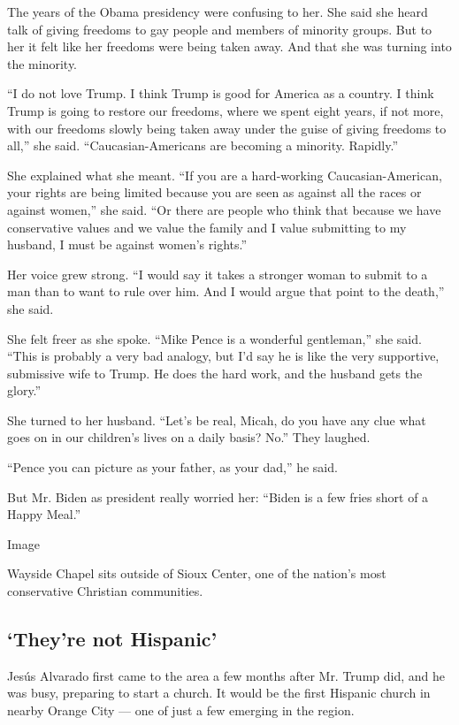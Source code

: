 The years of the Obama presidency were confusing to her. She said she
heard talk of giving freedoms to gay people and members of minority
groups. But to her it felt like her freedoms were being taken away. And
that she was turning into the minority.

``I do not love Trump. I think Trump is good for America as a country. I
think Trump is going to restore our freedoms, where we spent eight
years, if not more, with our freedoms slowly being taken away under the
guise of giving freedoms to all,'' she said. ``Caucasian-Americans are
becoming a minority. Rapidly.''

She explained what she meant. ``If you are a hard-working
Caucasian-American, your rights are being limited because you are seen
as against all the races or against women,'' she said. ``Or there are
people who think that because we have conservative values and we value
the family and I value submitting to my husband, I must be against
women's rights.''

Her voice grew strong. ``I would say it takes a stronger woman to submit
to a man than to want to rule over him. And I would argue that point to
the death,'' she said.

She felt freer as she spoke. ``Mike Pence is a wonderful gentleman,''
she said. ``This is probably a very bad analogy, but I'd say he is like
the very supportive, submissive wife to Trump. He does the hard work,
and the husband gets the glory.''

She turned to her husband. ``Let's be real, Micah, do you have any clue
what goes on in our children's lives on a daily basis? No.'' They
laughed.

``Pence you can picture as your father, as your dad,'' he said.

But Mr. Biden as president really worried her: ``Biden is a few fries
short of a Happy Meal.''

Image

Wayside Chapel sits outside of Sioux Center, one of the nation's most
conservative Christian communities.

\hypertarget{theyre-not-hispanic}{%
\subsection{`They're not Hispanic'}\label{theyre-not-hispanic}}

Jesús Alvarado first came to the area a few months after Mr. Trump did,
and he was busy, preparing to start a church. It would be the first
Hispanic church in nearby Orange City --- one of just a few emerging in
the region.

